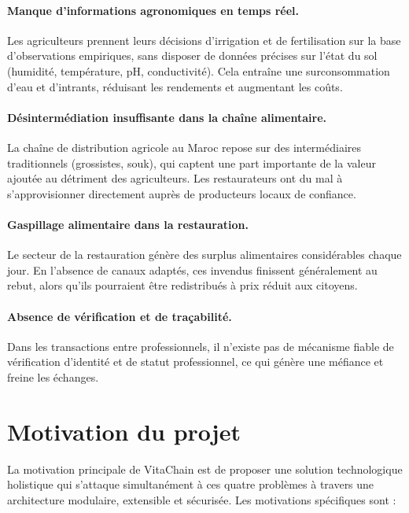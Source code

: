 \documentclass[12pt,a4paper]{report}
\begin{document}
\paragraph{Manque d'informations agronomiques en temps réel.}
Les agriculteurs prennent leurs décisions d'irrigation et de fertilisation sur la base
d'observations empiriques, sans disposer de données précises sur l'état du sol (humidité,
température, pH, conductivité). Cela entraîne une surconsommation d'eau et d'intrants,
réduisant les rendements et augmentant les coûts.

\paragraph{Désintermédiation insuffisante dans la chaîne alimentaire.}
La chaîne de distribution agricole au Maroc repose sur des intermédiaires traditionnels
(grossistes, souk), qui captent une part importante de la valeur ajoutée au détriment
des agriculteurs. Les restaurateurs ont du mal à s'approvisionner directement auprès de
producteurs locaux de confiance.

\paragraph{Gaspillage alimentaire dans la restauration.}
Le secteur de la restauration génère des surplus alimentaires considérables chaque jour.
En l'absence de canaux adaptés, ces invendus finissent généralement au rebut, alors qu'ils
pourraient être redistribués à prix réduit aux citoyens.

\paragraph{Absence de vérification et de traçabilité.}
Dans les transactions entre professionnels, il n'existe pas de mécanisme fiable de
vérification d'identité et de statut professionnel, ce qui génère une méfiance et freine
les échanges.

\section{Motivation du projet}

La motivation principale de VitaChain est de proposer une solution technologique holistique
qui s'attaque simultanément à ces quatre problèmes à travers une architecture modulaire,
extensible et sécurisée. Les motivations spécifiques sont :
\end{document}
